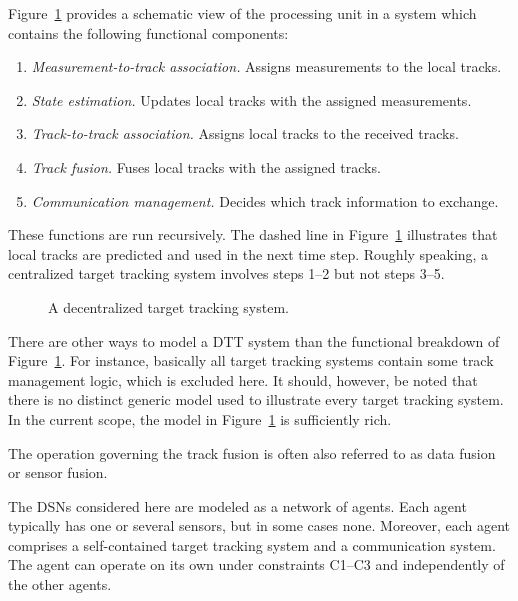 Figure~\ref{fig:intro:dtt-system} provides a schematic view of the processing unit in a \abbrDTT system which contains the following functional components:
\begin{enumerate}
	\item \emph{Measurement-to-track association.} Assigns measurements to the local tracks.
	\item \emph{State estimation.} Updates local tracks with the assigned measurements.
	\item \emph{Track-to-track association.} Assigns local tracks to the received tracks. 
	\item \emph{Track fusion.} Fuses local tracks with the assigned tracks.
	\item \emph{Communication management.} Decides which track information to exchange.
\end{enumerate}
These functions are run recursively. The dashed line in Figure~\ref{fig:intro:dtt-system} illustrates that local tracks are predicted and used in the next time step. Roughly speaking, a centralized target tracking system involves steps 1--2 but not steps 3--5.

\begin{figure}[t]
	\centering
	\begin{tikzpicture}[scale=.9]
		
	\end{tikzpicture}
	\caption{A decentralized target tracking system. }
	\label{fig:intro:dtt-system}
\end{figure}

\begin{remark}
There are other ways to model a DTT system than the functional breakdown of Figure~\ref{fig:intro:dtt-system}. For instance, basically all target tracking systems contain some track management logic, which is excluded here. It should, however, be noted that there is no distinct generic model used to illustrate every target tracking system. In the current scope, the model in Figure~\ref{fig:intro:dtt-system} is sufficiently rich.
\end{remark}

\begin{remark}
The operation governing the track fusion is often also referred to as data fusion or sensor fusion.
\end{remark}

The DSNs considered here are modeled as a network of agents. Each agent typically has one or several sensors, but in some cases none. Moreover, each agent comprises a self-contained target tracking system and a communication system. The agent can operate on its own under constraints C1--C3 and independently of the other agents.




